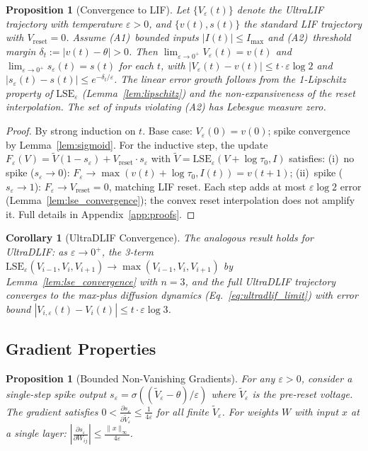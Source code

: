 \documentclass{article}
\theoremstyle{plain}
\newtheorem{proposition}[theorem]{Proposition}
\newtheorem{corollary}[theorem]{Corollary}
\theoremstyle{definition}
\theoremstyle{remark}
\newcommand{\lse}{\mathrm{LSE}}
\newcommand{\eps}{\varepsilon}
\begin{document}
\begin{proposition}[Convergence to LIF]
\label{prop:convergence}
Let $\{V_\eps(t)\}$ denote the UltraLIF trajectory with temperature $\eps > 0$, and $\{v(t), s(t)\}$ the standard LIF trajectory with $V_\mathrm{reset} = 0$. Assume (A1)~bounded inputs $|I(t)| \leq I_{\max}$ and (A2)~threshold margin $\delta_t := |v(t) - \theta| > 0$. Then $\lim_{\eps \to 0^+} V_\eps(t) = v(t)$ and $\lim_{\eps \to 0^+} s_\eps(t) = s(t)$ for each $t$, with $|V_\eps(t) - v(t)| \leq t \cdot \eps \log 2$ and $|s_\eps(t) - s(t)| \leq e^{-\delta_t/\eps}$. The linear error growth follows from the 1-Lipschitz property of $\lse_\eps$ (Lemma~\ref{lem:lipschitz}) and the non-expansiveness of the reset interpolation. The set of inputs violating (A2) has Lebesgue measure zero.
\end{proposition}

\begin{proof}
By strong induction on $t$. Base case: $V_\eps(0) = v(0)$; spike convergence by Lemma~\ref{lem:sigmoid}. For the inductive step, the update $F_\eps(V) = \tilde{V}(1 - s_\eps) + V_\mathrm{reset} \cdot s_\eps$ with $\tilde{V} = \lse_\eps(V + \log\tau_0, I)$ satisfies: (i)~no spike ($s_\eps \to 0$): $F_\eps \to \max(v(t) + \log\tau_0, I(t)) = v(t+1)$; (ii)~spike ($s_\eps \to 1$): $F_\eps \to V_\mathrm{reset} = 0$, matching LIF reset. Each step adds at most $\eps\log 2$ error (Lemma~\ref{lem:lse_convergence}); the convex reset interpolation does not amplify it. Full details in Appendix~\ref{app:proofs}.
\end{proof}

\begin{corollary}[UltraDLIF Convergence]
\label{cor:ultradlif_convergence}
The analogous result holds for UltraDLIF: as $\eps \to 0^+$, the 3-term $\lse_\eps(V_{i-1}, V_i, V_{i+1}) \to \max(V_{i-1}, V_i, V_{i+1})$ by Lemma~\ref{lem:lse_convergence} with $n{=}3$, and the full UltraDLIF trajectory converges to the max-plus diffusion dynamics (Eq.~\ref{eq:ultradlif_limit}) with error bound $|V_{i,\eps}(t) - V_i(t)| \leq t \cdot \eps \log 3$.
\end{corollary}

\subsection{Gradient Properties}

\begin{proposition}[Bounded Non-Vanishing Gradients]
\label{prop:gradients}
For any $\eps > 0$, consider a single-step spike output $s_\eps = \sigma((\tilde{V}_\eps - \theta)/\eps)$ where $\tilde{V}_\eps$ is the pre-reset voltage. The gradient satisfies $0 < \frac{\partial s_\eps}{\partial \tilde{V}_\eps} \leq \frac{1}{4\eps}$ for all finite $\tilde{V}_\eps$. For weights $W$ with input $x$ at a single layer: $\left|\frac{\partial s_\eps}{\partial W_{ij}}\right| \leq \frac{\|x\|_\infty}{4\eps}$.
\end{proposition}
\end{document}
